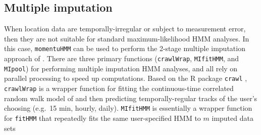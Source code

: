 \documentclass[12pt]{article}\usepackage[]{graphicx}\usepackage[]{color}
\begin{document}
\subsection{Multiple imputation}
\label{sec:mi}
When location data are temporally-irregular or subject to measurement error, then they are not suitable for standard maximum-likelihood HMM analyses. In this case, \verb|momentuHMM| can be used to perform the 2-stage multiple imputation approach of \cite{McClintock2017}. %
There are three primary functions (\verb|crawlWrap|, \verb|MIfitHMM|, and \verb|MIpool|) for performing multiple imputation HMM analyses, and all rely on parallel processing to speed up computations. Based on the R package \verb|crawl| \citep{Johnson2017}, \verb|crawlWrap| is a wrapper function for fitting the continuous-time correlated random walk %
model of \cite{JohnsonEtAl2008} and then predicting temporally-regular tracks of the user's choosing (e.g.\ 15 min, hourly, daily). %
\verb|MIfitHMM| is essentially a wrapper function for \verb|fitHMM| that repeatedly fits the same user-specified HMM to $m$ imputed data sets%
\end{document}
